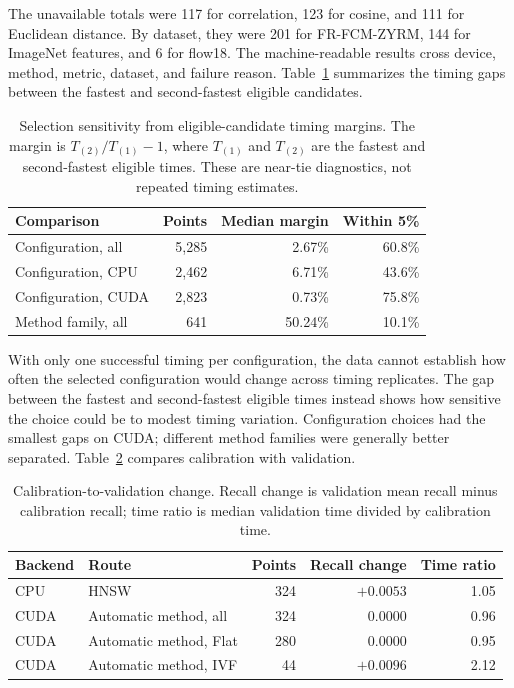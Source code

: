 \documentclass[11pt]{article}
\begin{document}
The unavailable totals were 117 for correlation, 123 for cosine, and 111 for
Euclidean distance. By dataset, they were 201 for FR-FCM-ZYRM, 144 for ImageNet
features, and 6 for flow18. The machine-readable results cross device,
method, metric, dataset, and failure reason.
Table~\ref{tab:calibration-stability} summarizes the timing gaps between
the fastest and second-fastest eligible candidates.

\begin{table}[h]
\centering

\begin{tabular}{@{}lrrr@{}}
\toprule
Comparison & Points & Median margin & Within 5\% \\
\midrule
Configuration, all & 5,285 & 2.67\% & 60.8\% \\
Configuration, CPU & 2,462 & 6.71\% & 43.6\% \\
Configuration, CUDA & 2,823 & 0.73\% & 75.8\% \\
Method family, all & 641 & 50.24\% & 10.1\% \\
\bottomrule
\end{tabular}
\caption{Selection sensitivity from eligible-candidate timing margins. The
margin is $T_{(2)}/T_{(1)}-1$, where $T_{(1)}$ and $T_{(2)}$ are the fastest and
second-fastest eligible times. These are near-tie diagnostics, not repeated
timing estimates.}
\label{tab:calibration-stability}
\end{table}

With only one successful timing per configuration, the data cannot establish
how often the selected configuration would change across timing replicates.
The gap between the fastest and second-fastest eligible times instead shows
how sensitive the choice could be to modest timing variation.
Configuration choices had the smallest gaps on CUDA; different method
families were generally better separated.
Table~\ref{tab:calibration-validation} compares calibration with validation.

\begin{table}[h]
\centering

\begin{tabular}{@{}llrrr@{}}
\toprule
Backend & Route & Points & Recall change & Time ratio \\
\midrule
CPU & HNSW & 324 & $+0.0053$ & 1.05 \\
CUDA & Automatic method, all & 324 & $0.0000$ & 0.96 \\
CUDA & Automatic method, Flat & 280 & $0.0000$ & 0.95 \\
CUDA & Automatic method, IVF & 44 & $+0.0096$ & 2.12 \\
\bottomrule
\end{tabular}
\caption{Calibration-to-validation change. Recall change is validation mean
recall minus calibration recall; time ratio is median validation time divided by
calibration time.}
\label{tab:calibration-validation}
\end{table}
\end{document}
